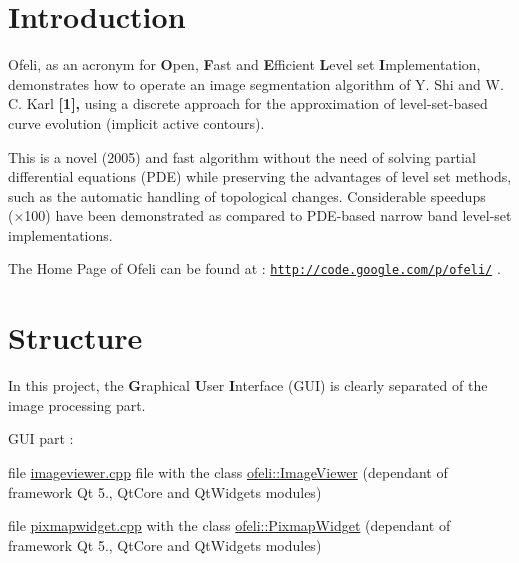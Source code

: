 \hypertarget{index_intro_sec}{}\section{Introduction}\label{index_intro_sec}
Ofeli, as an acronym for {\bfseries O}pen, {\bfseries F}ast and {\bfseries E}fficient {\bfseries L}evel set {\bfseries I}mplementation, demonstrates how to operate an image segmentation algorithm of Y. Shi and W. C. Karl {\bfseries \mbox{[}1\mbox{]},} using a discrete approach for the approximation of level-\/set-\/based curve evolution (implicit active contours).

This is a novel (2005) and fast algorithm without the need of solving partial differential equations (P\-D\-E) while preserving the advantages of level set methods, such as the automatic handling of topological changes. Considerable speedups (×100) have been demonstrated as compared to P\-D\-E-\/based narrow band level-\/set implementations.

The Home Page of Ofeli can be found at \-: \href{http://code.google.com/p/ofeli/}{\tt http\-://code.\-google.\-com/p/ofeli/} .\hypertarget{index_structure_sec}{}\section{Structure}\label{index_structure_sec}
In this project, the {\bfseries G}raphical {\bfseries U}ser {\bfseries I}nterface (G\-U\-I) is clearly separated of the image processing part.

G\-U\-I part \-:
\begin{DoxyItemize}
\item file \hyperlink{imageviewer_8cpp_source}{imageviewer.\-cpp} file with the class \hyperlink{classofeli_1_1_image_viewer}{ofeli\-::\-Image\-Viewer} (dependant of framework Qt 5., Qt\-Core and Qt\-Widgets modules)
\item file \hyperlink{pixmapwidget_8cpp_source}{pixmapwidget.\-cpp} with the class \hyperlink{classofeli_1_1_pixmap_widget}{ofeli\-::\-Pixmap\-Widget} (dependant of framework Qt 5., Qt\-Core and Qt\-Widgets modules)
\end{DoxyItemize}

